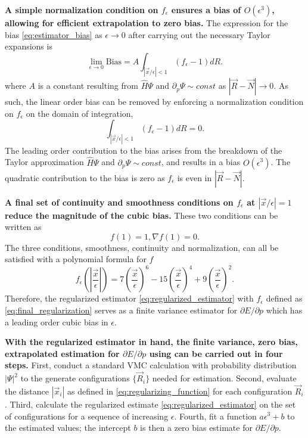 \documentclass{article}
\begin{document}
\textbf{A simple normalization condition on $f_\epsilon$ ensures a bias of $O(\epsilon^3)$, allowing for efficient extrapolation to zero bias.}
The expression for the bias \eqref{eq:estimator_bias} as $\epsilon \rightarrow 0$ after carrying out the necessary Taylor expansions is
$$
\lim_{\epsilon\rightarrow 0}\text{Bias} =  A \int_{|\vec{x}/\epsilon|< 1} (f_\epsilon - 1) dR.
$$
where $A$ is a constant resulting from $\hat{H}\Psi$ and $\partial_p \Psi \sim const$ as $|\vec{R}-\vec{N}|\rightarrow 0$.
As such, the linear order bias can be removed by enforcing a normalization condition on $f_\epsilon$ on the domain of integration, 
\begin{equation}
\int_{|\vec{x}/\epsilon|< 1} (f_\epsilon - 1) dR = 0.
\label{eq:normalization_condition}
\end{equation}
The leading order contribution to the bias arises from the breakdown of the Taylor approximation $\hat{H}\Psi$ and $\partial_p \Psi \sim const$, and results in a bias $O(\epsilon^3)$.
The quadratic contribution to the bias is zero as $f_\epsilon$ is even in $|\vec{R}-\vec{N}|$.

\textbf{A final set of continuity and smoothness conditions on $f_\epsilon$ at $|\vec{x}/\epsilon| = 1$ reduce the magnitude of the cubic bias.}
These two conditions can be written as 
\begin{equation}
f(1) = 1, \nabla f(1) = 0.
\label{eq:smoothness_condition}
\end{equation}
The three conditions, smoothness, continuity and normalization, can all be satisfied with a polynomial formula for $f$
\begin{equation}
f_\epsilon(|\frac{\vec{x}}{\epsilon}|) = 7(\frac{\vec{x}}{\epsilon})^6 - 15(\frac{\vec{x}}{\epsilon})^4 + 9(\frac{\vec{x}}{\epsilon})^2.
\label{eq:final_regularization}
\end{equation}
Therefore, the regularized estimator \eqref{eq:regularized_estimator} with $f_\epsilon$ defined as \eqref{eq:final_regularization} serves as a finite variance estimator for $\partial E/\partial p$ which has a leading order cubic bias in $\epsilon$.

\textbf{With the regularized estimator in hand, the finite variance, zero bias, extrapolated estimation for $\partial E/\partial p$ using can be carried out in four steps.}
First, conduct a standard VMC calculation with probability distribution $|\Psi|^2$ to the generate configurations $\{\vec{R}_i\}$ needed for estimation.
Second, evaluate the distance $|\vec{x}_i|$ as defined in \eqref{eq:regularizing_function} for each configuration $\vec{R}_i$.
Third, calculate the regularized estimate \eqref{eq:regularized_estimator} on the set of configurations for a sequence of increasing $\epsilon$.
Fourth, fit a function $a\epsilon^3 + b$ to the estimated values; the intercept $b$ is then a zero bias estimate for $\partial E/\partial p.$
\end{document}
